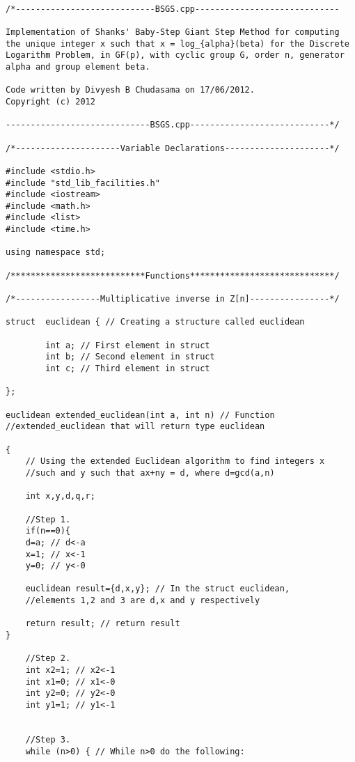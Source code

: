 \documentclass[iwp,first]{luthesis}
\begin{document}
\begin{verbatim}

/*----------------------------BSGS.cpp-----------------------------

Implementation of Shanks' Baby-Step Giant Step Method for computing 
the unique integer x such that x = log_{alpha}(beta) for the Discrete 
Logarithm Problem, in GF(p), with cyclic group G, order n, generator 
alpha and group element beta.

Code written by Divyesh B Chudasama on 17/06/2012.
Copyright (c) 2012

-----------------------------BSGS.cpp----------------------------*/

/*---------------------Variable Declarations---------------------*/

#include <stdio.h>
#include "std_lib_facilities.h"
#include <iostream>
#include <math.h>
#include <list>
#include <time.h>

using namespace std;

/***************************Functions*****************************/

/*-----------------Multiplicative inverse in Z[n]----------------*/

struct  euclidean { // Creating a structure called euclidean
        
        int a; // First element in struct 
        int b; // Second element in struct
        int c; // Third element in struct
        
};

euclidean extended_euclidean(int a, int n) // Function 
//extended_euclidean that will return type euclidean

{
    // Using the extended Euclidean algorithm to find integers x 
    //such and y such that ax+ny = d, where d=gcd(a,n)

    int x,y,d,q,r;
    
    //Step 1.  
    if(n==0){ 
    d=a; // d<-a
    x=1; // x<-1
    y=0; // y<-0
    
    euclidean result={d,x,y}; // In the struct euclidean, 
    //elements 1,2 and 3 are d,x and y respectively
    
    return result; // return result
}
    
    //Step 2.
    int x2=1; // x2<-1
    int x1=0; // x1<-0
    int y2=0; // y2<-0
    int y1=1; // y1<-1
   
    
    //Step 3.
    while (n>0) { // While n>0 do the following:
          

\end{verbatim}
\end{document}
